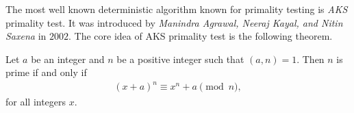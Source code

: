 \documentclass{subfiles}
\begin{document}
	The most well known deterministic algorithm known for primality testing is \textit{AKS} primality test. It was introduced by \textit{Manindra Agrawal, Neeraj Kayal, and Nitin Saxena} in $2002$. The core idea of AKS primality test is the following theorem.
	\begin{theorem}
		Let $a$ be an integer and $n$ be a positive integer such that $(a,n)=1$. Then $n$ is prime if and only if
		\begin{align*}
			(x+a)^n \equiv x^n + a \pmod n,
		\end{align*}
		for all integers $x$.
	\end{theorem}
	
\end{document}
